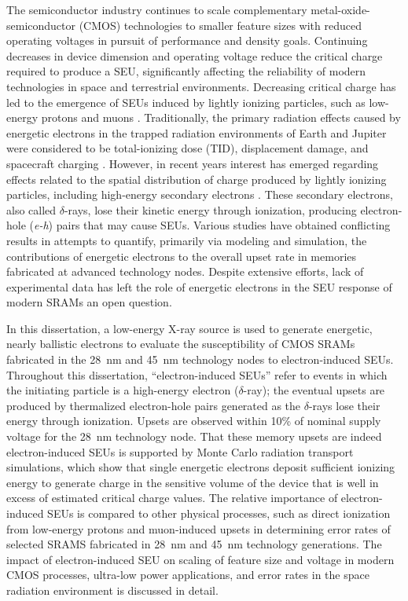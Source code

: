 The semiconductor industry continues to scale complementary metal-oxide-semiconductor (CMOS) technologies to smaller feature sizes with reduced operating voltages in pursuit of performance and density goals.
Continuing decreases in device dimension and operating voltage reduce the critical charge required to produce a SEU, significantly affecting the reliability of modern technologies in space and terrestrial environments. 
Decreasing critical charge has led to the emergence of SEUs induced by lightly ionizing particles, such as low-energy protons and muons \cite{Rodbell:2007vl, Sierawski:2010cj}. 
Traditionally, the primary radiation effects caused by energetic electrons in the trapped radiation environments of Earth and Jupiter were considered to be total-ionizing dose (TID), displacement damage, and spacecraft charging \cite{Bourdarie:kj, Xapsos:2013cu}. 
However, in recent years interest has emerged regarding effects related to the spatial distribution of charge produced by lightly ionizing particles, including high-energy secondary electrons \cite{Weller:2003je, Raine:2010cna, Raine:gk, Raine:2012gi, King:2010cu, King:2012cb, Barak:2012im}. 
These secondary electrons, also called $\delta$-rays, lose their kinetic energy through ionization, producing electron-hole (\emph{e-h}) pairs that may cause SEUs. 
Various studies \cite{Weller:2003je, Raine:2010cna, Raine:gk, Raine:2012gi, King:2010cu, King:2012cb, Barak:2012im} have obtained conflicting results in attempts to quantify, primarily via modeling and simulation, the contributions of energetic electrons to the overall upset rate in memories fabricated at advanced technology nodes. 
Despite extensive efforts, lack of experimental data has left the role of energetic electrons in the SEU response of modern SRAMs an open question.

In this dissertation, a low-energy X-ray source is used to generate energetic, nearly ballistic electrons to evaluate the susceptibility of CMOS SRAMs fabricated in the 28~nm and 45~nm technology nodes to electron-induced SEUs. 
Throughout this dissertation, ``electron-induced SEUs'' refer to events in which the initiating particle is a high-energy electron ($\delta$-ray); the eventual upsets are produced by thermalized electron-hole pairs generated as the $\delta$-rays lose their energy through ionization. 
Upsets are observed within 10\% of nominal supply voltage for the 28~nm technology node. 
That these memory upsets are indeed electron-induced SEUs is supported by Monte Carlo radiation transport simulations, which show that single energetic electrons deposit sufficient ionizing energy to generate charge in the sensitive volume of the device that is well in excess of estimated critical charge values. 
The relative importance of electron-induced SEUs is compared to other physical processes, such as direct ionization from low-energy protons \cite{Rodbell:2007vl, Heidel:2008vf, Heidel:2009vx, Sierawski:2009ka} and muon-induced upsets \cite{Sierawski:2010cj, Sierawski:2011bn} in determining error rates of selected SRAMS fabricated in 28~nm and 45~nm technology generations. 
The impact of electron-induced SEU on scaling of feature size and voltage in modern CMOS processes, ultra-low power applications, and error rates in the space radiation environment is discussed in detail.

